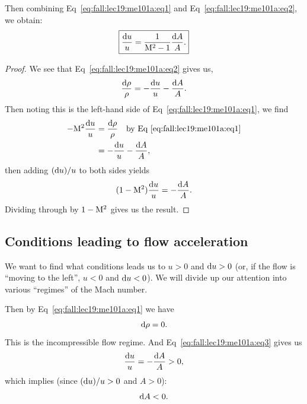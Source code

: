 \begin{node}
Then combining Eq~\eqref{eq:fall:lec19:me101a:eq1}
and Eq~\eqref{eq:fall:lec19:me101a:eq2}, we obtain:
\begin{equation}\label{eq:fall:lec19:me101a:eq3}
  \boxed{\frac{\mathrm{d} u}{u}=\frac{1}{\mathrm{M}^{2}-1}\frac{\mathrm{d} A}{A}.}
\end{equation}
\end{node}

\begin{proof}
We see that Eq~\eqref{eq:fall:lec19:me101a:eq2} gives us,
\begin{equation}
\frac{\mathrm{d}\rho}{\rho} = -\frac{\mathrm{d} u}{u} -\frac{\mathrm{d} A}{A}.
\end{equation}
Then noting this is the left-hand side of Eq~\eqref{eq:fall:lec19:me101a:eq1},
we find
\begin{subequations}
  \begin{align}
-\mathrm{M}^{2}\frac{\mathrm{d} u}{u} &= \frac{\mathrm{d}\rho}{\rho}\quad\mbox{by Eq~\eqref{eq:fall:lec19:me101a:eq1}}\\
&= -\frac{\mathrm{d} u}{u} -\frac{\mathrm{d} A}{A},
  \end{align}
\end{subequations}
then adding $(\mathrm{d} u)/u$ to both sides yields
\begin{equation}
(1-\mathrm{M}^{2})\frac{\mathrm{d} u}{u} = -\frac{\mathrm{d} A}{A}.
\end{equation}
Dividing through by $1-\mathrm{M}^{2}$ gives us the result.
\end{proof}


\subsection{Conditions leading to flow acceleration}

\begin{node}
We want to find what conditions leads us to $u>0$ and $\mathrm{d} u>0$ (or, if
the flow is ``moving to the left'', $u<0$ and $\mathrm{d} u<0$). We will
divide up our attention into various ``regimes'' of the Mach number.
\end{node}

\begin{case}[$\Mach=0$]\label{case:fall:lec19:me101a:case1}
Then by Eq~\eqref{eq:fall:lec19:me101a:eq1} we have
\begin{equation}
\mathrm{d}\rho=0.
\end{equation}
This is the incompressible flow regime. And Eq~\eqref{eq:fall:lec19:me101a:eq3}
gives us
\begin{equation}
\frac{\mathrm{d} u}{u}=-\frac{\mathrm{d} A}{A}>0,
\end{equation}
which implies (since $(\mathrm{d} u)/u>0$ and $A>0$):
\begin{equation}
\mathrm{d} A < 0.
\end{equation}
\end{case}

